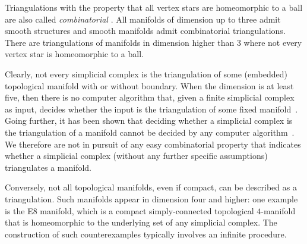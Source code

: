\documentclass[10pt,letterpaper]{article}
\begin{document}
\begin{remark}
    Triangulations with the property that all vertex stars are homeomorphic to a ball are also called \emph{combinatorial} \cite[Section~1]{Bagchi2005}.
    All manifolds of dimension up to three admit smooth structures and smooth manifolds admit combinatorial triangulations. 
    There are triangulations of manifolds in dimension higher than $3$ where not every vertex star is homeomorphic to a ball. 
    
    Clearly, not every simplicial complex is the triangulation of some (embedded) topological manifold with or without boundary. 
    When the dimension is at least five, then there is no computer algorithm that, given a finite simplicial complex as input, decides whether the input is the triangulation of some fixed manifold~\cite{chernavsky2006unrecognizability}.
    Going further, it has been shown that deciding whether a simplicial complex is the triangulation of a manifold cannot be decided by any computer algorithm~\cite{poonen2014undecidable}.     
    We therefore are not in pursuit of any easy combinatorial property that indicates whether a simplicial complex (without any further specific assumptions) triangulates a manifold.

    Conversely, not all topological manifolds, even if compact, can be described as a triangulation. 
    Such manifolds appear in dimension four and higher:
    one example is the E8 manifold, which is a compact simply-connected topological $4$-manifold that is homeomorphic to the underlying set of any simplicial complex. The construction of such counterexamples typically involves an infinite procedure.
\end{remark}
\end{document}
